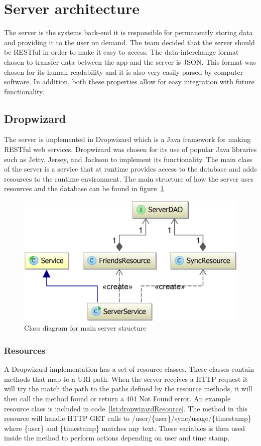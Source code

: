 \section{Server architecture}
\label{sec:arch_server}
The server is the systems back-end it is responsible for permanently storing data and providing it to the user on demand. The team decided that the server should be RESTful in order to make it easy to access. The data-interchange format chosen to transfer data between the app and the server is JSON. This format was chosen for its human readability and it is also very easily parsed by computer software. In addition, both these properties allow for easy integration with future functionality.

\subsection{Dropwizard}
The server is implemented in Dropwizard which is a Java framework for making RESTful web services. Dropwizard was chosen for its use of popular Java libraries such as Jetty, Jersey, and Jackson to implement its functionality. The main class of the server is a service that at runtime provides access to the database and adds resources to the runtime environment. The main structure of how the server uses resources and the database can be found in figure~\ref{fig:classDiagramServer}.

\begin{figure}[H]
\includegraphics[width=\textwidth]{ch/architecture/fig/classDiagramServer.png}
\caption{Class diagram for main server structure}
\label{fig:classDiagramServer}
\end{figure}

\subsubsection{Resources}
A Dropwizard implementation has a set of resource classes. These classes contain methods that map to a URI path. When the server receives a HTTP request it will try the match the path to the paths defined by the resource methods, it will then call the method found or return a 404 Not Found error. An example resource class is included in code~\ref{lst:dropwizardResource}. The method in this resource will handle HTTP GET calls to /user/\{user\}/sync/usage/\{timestamp\} where \{user\} and \{timestamp\} matches any text. These variables is then used inside the method to perform actions depending on user and time stamp.
\newline

